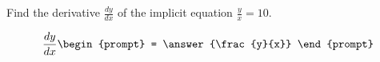 \documentclass{ximera}
\author{Gregory Hartman \and Matthew Carr}
\begin{document}
\begin{exercise}



Find the derivative $\frac{dy}{dx}$ of the implicit equation $\frac{y}{x}=10$.

\[
\frac{dy}{dx}
\begin{prompt}
= \answer{\frac{y}{x}}
\end{prompt}
\]

\end{exercise}
\end{document}
